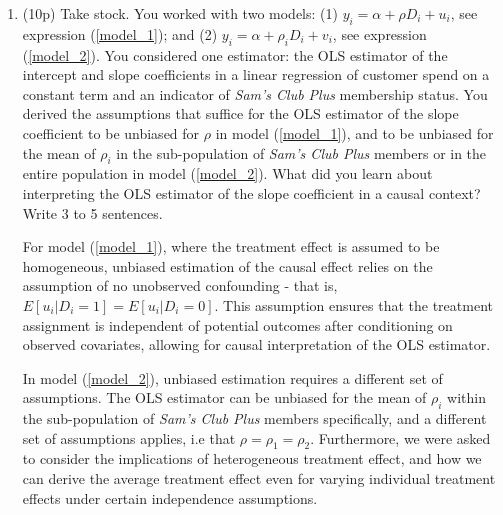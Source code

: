 \documentclass{article}
\begin{document}
\begin{enumerate}[label=\textbf{Q\arabic{enumi}}.,ref=Q\arabic{enumi}, wide=0pt, itemsep=1em, topsep=5pt]

    \item (10p) Take stock. You worked with two models: (1) $y_{i}=\alpha +\rho D_{i}+u _{i}$, see expression (\ref{model_1}); and (2) $y_{i}=\alpha +\rho _{i}D_{i}+v_{i}$, see expression (\ref{model_2}). You considered one estimator: the OLS estimator of the intercept and slope coefficients in a linear regression of customer spend on a constant term and an indicator of \textit{Sam's Club Plus} membership status. You derived the assumptions that suffice for the OLS estimator of the slope coefficient to be unbiased for $\rho$ in model (\ref{model_1}), and to be unbiased for the mean of $\rho _{i}$ in the sub-population of \textit{Sam's Club Plus}  members or in the entire population in model (\ref{model_2}). What did you learn about interpreting the OLS estimator of the slope coefficient in a causal context? Write 3 to 5 sentences.
    \begin{solution}
    {
        For model (\ref{model_1}), where the treatment effect is assumed to be homogeneous, unbiased estimation of the causal effect relies on the assumption of no unobserved confounding - that is, $E[u_i|D_i=1]=E[u_i|D_i=0]$. This assumption ensures that the treatment assignment is independent of potential outcomes after conditioning on observed covariates, allowing for causal interpretation of the OLS estimator.\medskip

        In model (\ref{model_2}), unbiased estimation requires a different set of assumptions. The OLS estimator can be unbiased for the mean of $\rho_i$ within the sub-population of \textit{Sam's Club Plus} members specifically, and a different set of assumptions applies, i.e that $\rho = \rho_1 = \rho_2$. Furthermore, we were asked to consider the implications of heterogeneous treatment effect, and how we can derive the average treatment effect even for varying individual treatment effects under certain independence assumptions.
    }
        
    \end{solution}
\end{enumerate}
\end{document}
